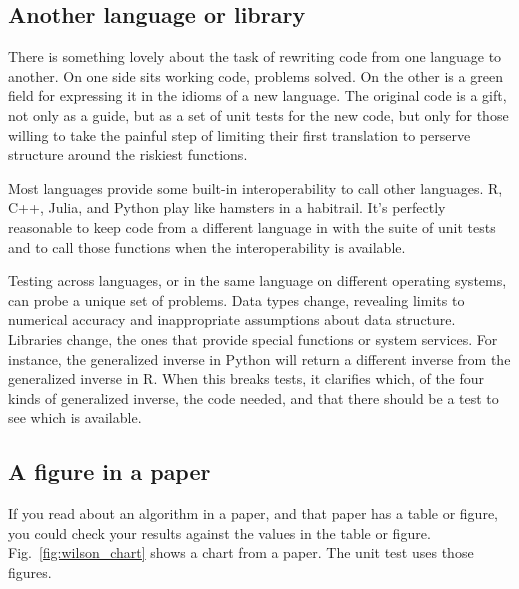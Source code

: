 \documentclass[fleqn,10pt]{olplainarticle}
\begin{document}
\subsection{Another language or library}

There is something lovely about the task of rewriting code from
one language to another. On one side sits working code, problems
solved. On the other is a green field for expressing it in the idioms
of a new language. The original code is a gift, not only as a guide,
but as a set of unit tests for the new code, but only for those
willing to take the painful step of limiting their first translation
to perserve structure around the riskiest functions.

Most languages provide some built-in interoperability to call
other languages. R, C++, Julia, and Python play like hamsters
in a habitrail. It's perfectly reasonable to keep code from
a different language in with the suite of unit tests and to
call those functions when the interoperability is available.

Testing across languages, or in the same language on different
operating systems, can probe a unique set of problems. Data types
change, revealing limits to numerical accuracy and inappropriate
assumptions about data structure. Libraries change, the ones that
provide special functions or system services. For instance, the
generalized inverse in Python will return a different inverse
from the generalized inverse in R. When this breaks tests, it
clarifies which, of the four kinds of generalized inverse,
the code needed, and that there should be a test to see which
is available.


\subsection{A figure in a paper}
If you read about an algorithm in a paper, and that paper has a table or figure,
you could check your results against the values in the table or figure.
Fig.~\ref{fig:wilson_chart} shows a chart from a paper. The unit test
uses those figures.
\end{document}
